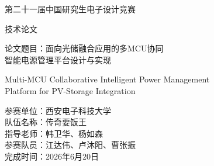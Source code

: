 ﻿%
\begin{titlepage}
\centering
\vspace*{1cm}
{\heiti 第二十一届中国研究生电子设计竞赛\par}
\vspace{0.5cm}
{\heiti 技术论文\par}
\vspace{1.5cm}
{\heiti 论文题目：面向光储融合应用的多MCU协同\\智能电源管理平台设计与实现\par}
\vspace{0.3cm}
{
\setlength{\baselineskip}{18pt}
\sffamily
Multi-MCU Collaborative Intelligent Power Management\\ Platform for PV-Storage Integration\par
}
\vspace{3cm}
\begin{flushleft}
\hspace*{4cm}
\begin{minipage}{0.6\textwidth}
\heiti
参赛单位：西安电子科技大学\\[0.4cm]
队伍名称：传奇要饭王\\[0.4cm]
指导老师：韩卫华、杨如森\\[0.4cm]
参赛队员：江达伟、卢沐阳、曹张振\\[0.4cm]
完成时间：2026年6月20日
\end{minipage}
\end{flushleft}
\end{titlepage}

